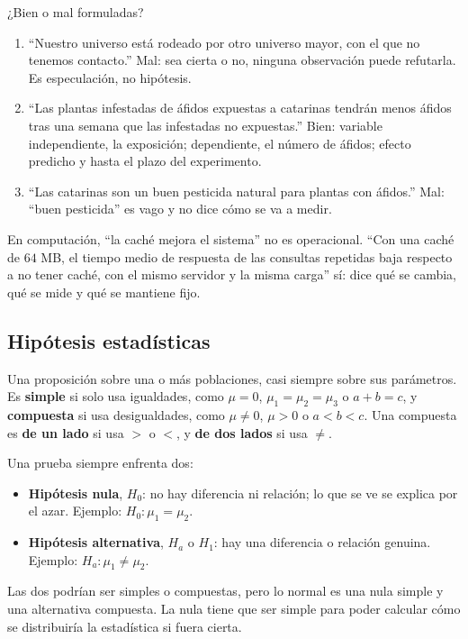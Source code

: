\documentclass[11pt,letterpaper]{article}
\begin{document}
\begin{ejemplo}
    ¿Bien o mal formuladas?
    \begin{enumerate}[label=\alph*), itemsep=0.2em]
        \item ``Nuestro universo está rodeado por otro universo mayor,
              con el que no tenemos contacto.'' Mal: sea cierta o no,
              ninguna observación puede refutarla. Es especulación, no
              hipótesis.
        \item ``Las plantas infestadas de áfidos expuestas a catarinas
              tendrán menos áfidos tras una semana que las infestadas
              no expuestas.'' Bien: variable independiente, la
              exposición; dependiente, el número de áfidos; efecto
              predicho y hasta el plazo del experimento.
        \item ``Las catarinas son un buen pesticida natural para plantas
              con áfidos.'' Mal: ``buen pesticida'' es vago y no dice
              cómo se va a medir.
    \end{enumerate}
\end{ejemplo}

En computación, ``la caché mejora el sistema'' no es operacional.
``Con una caché de $64$ MB, el tiempo medio de respuesta de las
consultas repetidas baja respecto a no tener caché, con el mismo
servidor y la misma carga'' sí: dice qué se cambia, qué se mide y qué
se mantiene fijo.


\subsection*{Hipótesis estadísticas}

\begin{definicion}
    Una proposición sobre una o más poblaciones, casi siempre sobre sus
    parámetros. Es \textbf{simple} si solo usa igualdades, como
    $\mu = 0$, $\mu_1 = \mu_2 = \mu_3$ o $a + b = c$, y
    \textbf{compuesta} si usa desigualdades, como $\mu \neq 0$,
    $\mu > 0$ o $a < b < c$. Una compuesta es \textbf{de un lado} si
    usa $>$ o $<$, y \textbf{de dos lados} si usa $\neq$.
\end{definicion}

Una prueba siempre enfrenta dos:
\begin{itemize}[itemsep=0.3em]
    \item \textbf{Hipótesis nula}, $H_0$: no hay diferencia ni relación;
          lo que se ve se explica por el azar. Ejemplo:
          $H_0\colon \mu_1 = \mu_2$.
    \item \textbf{Hipótesis alternativa}, $H_a$ o $H_1$: hay una
          diferencia o relación genuina. Ejemplo:
          $H_a\colon \mu_1 \neq \mu_2$.
\end{itemize}
Las dos podrían ser simples o compuestas, pero lo normal es una nula
simple y una alternativa compuesta. La nula tiene que ser simple para
poder calcular cómo se distribuiría la estadística si fuera cierta.
\end{document}

